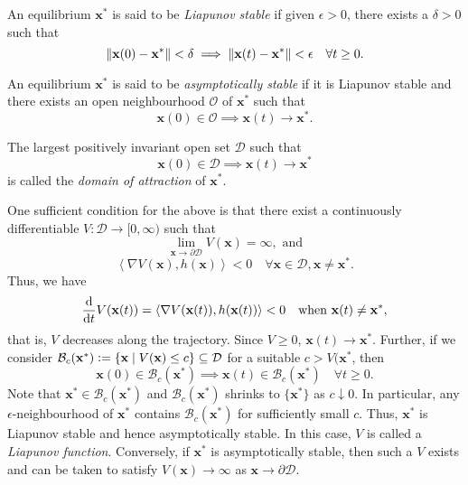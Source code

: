 \begin{defn}
    An equilibrium $\mathbf{x}^*$ is said to be \emph{Liapunov stable} if given $\epsilon > 0$, there exists a $\delta > 0$ such that
    \[
        \norm{\mathbf{x}(0) - \mathbf{x}^*} < \delta \implies \norm{\mathbf{x}(t) - \mathbf{x}^*} < \epsilon \quad \forall t \geq 0.
    \]
\end{defn}
\begin{defn}
    An equilibrium $\mathbf{x}^*$ is said to be \emph{asymptotically stable} if it is Liapunov stable and there exists an open neighbourhood $\mathcal{O}$ of $\mathbf{x}^*$ such that 
    \[
        \mathbf{x}(0) \in \mathcal{O} \implies \mathbf{x}(t) \to \mathbf{x}^*.
    \]
\end{defn}
\begin{defn}
    The largest positively invariant open set $\mathcal{D}$ such that 
    \[
        \mathbf{x}(0) \in \mathcal{D} \implies \mathbf{x}(t) \to \mathbf{x}^*
    \]
    is called the \emph{domain of attraction} of $\mathbf{x}^*$. 
\end{defn}

One sufficient condition for the above is that there exist a continuously differentiable $V \colon \mathcal{D} \to [0,\infty)$ such that
\[
    \lim_{\mathbf{x} \to \partial \mathcal{D}} V(\mathbf{x}) = \infty, \text{ and}
\]
\[
    \left\langle \nabla V(\mathbf{x}), h(\mathbf{x})\right\rangle < 0 \quad \forall \mathbf{x} \in \mathcal{D}, \mathbf{x} \neq \mathbf{x}^*.
\]
Thus, we have
\[
    \frac{\mathrm{d}}{\mathrm{d} t}V(\mathbf{x}(t)) = \left\langle \nabla V(\mathbf{x}(t)), h(\mathbf{x}(t))\right\rangle < 0 \quad \text{when }\mathbf{x}(t) \neq \mathbf{x}^*,
\]
that is, $V$ decreases along the trajectory. Since $V \geq 0$, $\mathbf{x}(t) \to \mathbf{x}^*$. Further, if we consider $\mathcal{B}_c(\mathbf{x}^*) \vcentcolon= \{ \mathbf{x} \mid V(\mathbf{x}) \leq c \} \subseteq \mathcal{D}$ for a suitable $c > V(\mathbf{x}^*$, then 
\[
    \mathbf{x}(0) \in \mathcal{B}_c(\mathbf{x}^*) \implies \mathbf{x}(t) \in \mathcal{B}_c(\mathbf{x}^*) \quad \forall t \geq 0.
\]
Note that $\mathbf{x}^* \in \mathcal{B}_c(\mathbf{x}^*)$ and $\mathcal{B}_c(\mathbf{x}^*)$ shrinks to $\{\mathbf{x}^*\}$ as $c \downarrow 0$. In particular, any $\epsilon$-neighbourhood of $\mathbf{x}^*$ contains $\mathcal{B}_c(\mathbf{x}^*)$ for sufficiently small $c$. Thus, $\mathbf{x}^*$ is Liapunov stable and hence asymptotically stable. In this case, $V$ is called a \emph{Liapunov function}. Conversely, if $\mathbf{x}^*$ is asymptotically stable, then such a $V$ exists and can be taken to satisfy $V(\mathbf{x}) \to \infty$ as $\mathbf{x} \to \partial \mathcal{D}$.

